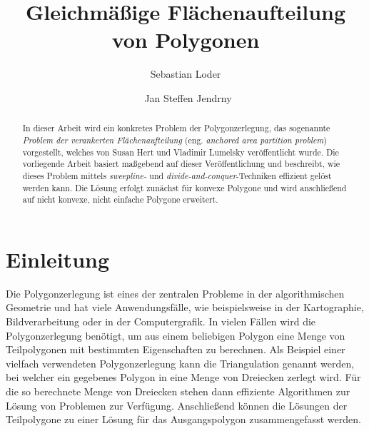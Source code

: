 \documentclass[ngerman]{seminarbeitrag}
\begin{document}
\title{Gleichmäßige Flächenaufteilung von Polygonen}
\author{Sebastian Loder\and\ Jan Steffen Jendrny}

\maketitle%


\begin{abstract}
In dieser Arbeit wird ein konkretes Problem der Polygonzerlegung, das sogenannte \emph{Problem der verankerten Flächenaufteilung} (eng. \emph{anchored area partition problem}) vorgestellt, welches von Susan Hert und Vladimir Lumelsky \cite{Hert.1998} veröffentlicht wurde. Die vorliegende Arbeit basiert maßgebend auf dieser Veröffentlichung und beschreibt, wie dieses Problem mittels \emph{sweepline-} und \emph{divide-and-conquer}-Techniken effizient gelöst werden kann. Die Lösung erfolgt zunächst für konvexe Polygone und wird anschließend auf nicht konvexe, nicht einfache Polygone erweitert.

\end{abstract}


\section{Einleitung}\label{einleitung}
Die Polygonzerlegung ist eines der zentralen Probleme in der algorithmischen Geometrie und hat viele Anwendungsfälle, wie beispielsweise in der Kartographie,
Bildverarbeitung oder in der Computergrafik. In vielen Fällen wird die Polygonzerlegung benötigt, um aus einem beliebigen Polygon eine Menge von Teilpolygonen mit bestimmten
Eigenschaften zu berechnen. Als Beispiel einer vielfach verwendeten Polygonzerlegung kann die Triangulation genannt werden, bei welcher ein gegebenes Polygon in eine Menge von Dreiecken
zerlegt wird. Für die so berechnete Menge von Dreiecken stehen dann effiziente Algorithmen zur Lösung von Problemen zur Verfügung. Anschließend können die Lösungen der Teilpolygone zu
einer Lösung für das Ausgangspolygon zusammengefasst werden. \\
\end{document}
